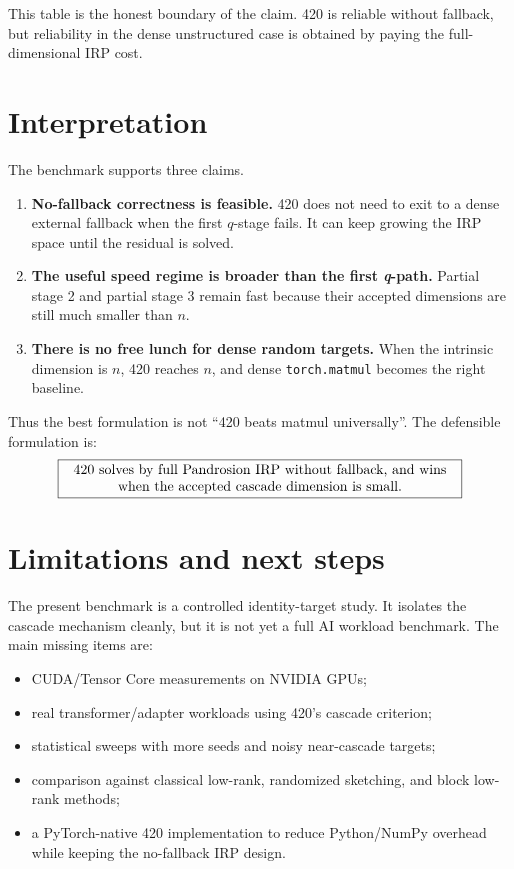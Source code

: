 \documentclass[11pt]{article}
\newcommand{\qpath}{\textit{q}\nobreakdash-path}
\newcommand{\matmul}{\texttt{torch.matmul}}
\begin{document}
This table is the honest boundary of the claim.  420 is reliable without
fallback, but reliability in the dense unstructured case is obtained by paying
the full-dimensional IRP cost.

\section{Interpretation}

The benchmark supports three claims.

\begin{enumerate}[leftmargin=1.4em]
\item \textbf{No-fallback correctness is feasible.}  420 does not need to exit
to a dense external fallback when the first \(q\)-stage fails.  It can keep
growing the IRP space until the residual is solved.
\item \textbf{The useful speed regime is broader than the first \qpath.}
Partial stage 2 and partial stage 3 remain fast because their accepted
dimensions are still much smaller than \(n\).
\item \textbf{There is no free lunch for dense random targets.}  When the
intrinsic dimension is \(n\), 420 reaches \(n\), and dense \matmul{} becomes the
right baseline.
\end{enumerate}

Thus the best formulation is not ``420 beats matmul universally''.  The
defensible formulation is:
\[
\boxed{
\begin{minipage}{0.82\linewidth}
\centering
420 solves by full Pandrosion IRP without fallback, and wins when the accepted
cascade dimension is small.
\end{minipage}}
\]

\section{Limitations and next steps}

The present benchmark is a controlled identity-target study.  It isolates the
cascade mechanism cleanly, but it is not yet a full AI workload benchmark.  The
main missing items are:
\begin{itemize}[leftmargin=1.2em]
\item CUDA/Tensor Core measurements on NVIDIA GPUs;
\item real transformer/adapter workloads using 420's cascade criterion;
\item statistical sweeps with more seeds and noisy near-cascade targets;
\item comparison against classical low-rank, randomized sketching, and block
low-rank methods;
\item a PyTorch-native 420 implementation to reduce Python/NumPy overhead while
keeping the no-fallback IRP design.
\end{itemize}
\end{document}

